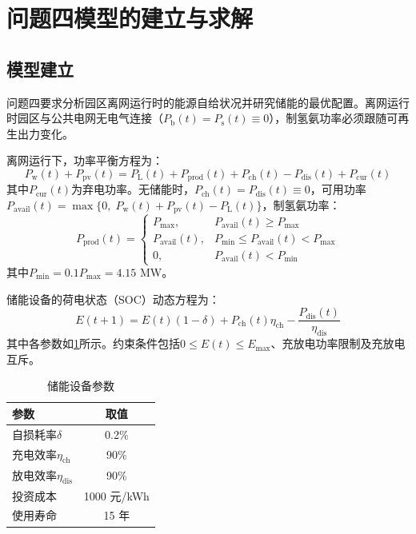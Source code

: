 \section{问题四模型的建立与求解}

\subsection{模型建立}

问题四要求分析园区离网运行时的能源自给状况并研究储能的最优配置。离网运行时园区与公共电网无电气连接（$P_{\mathrm{b}}(t)=P_{\mathrm{s}}(t)\equiv 0$），制氢氨功率必须跟随可再生出力变化。

离网运行下，功率平衡方程为：
\begin{equation}
P_{\mathrm{w}}(t) + P_{\mathrm{pv}}(t) = P_{\mathrm{L}}(t) + P_{\mathrm{prod}}(t) + P_{\mathrm{ch}}(t) - P_{\mathrm{dis}}(t) + P_{\mathrm{cur}}(t) \label{eq:q4_bal}
\end{equation}
其中$P_{\mathrm{cur}}(t)$为弃电功率。无储能时，$P_{\mathrm{ch}}(t)=P_{\mathrm{dis}}(t)\equiv 0$，可用功率$P_{\mathrm{avail}}(t) = \max\{0,\; P_{\mathrm{w}}(t)+P_{\mathrm{pv}}(t)-P_{\mathrm{L}}(t)\}$，制氢氨功率：
\begin{equation}
P_{\mathrm{prod}}(t) = \begin{cases}
P_{\mathrm{max}}, & P_{\mathrm{avail}}(t) \ge P_{\mathrm{max}} \\
P_{\mathrm{avail}}(t), & P_{\mathrm{min}} \le P_{\mathrm{avail}}(t) < P_{\mathrm{max}} \\
0, & P_{\mathrm{avail}}(t) < P_{\mathrm{min}}
\end{cases} \label{eq:q4_prod}
\end{equation}
其中$P_{\mathrm{min}} = 0.1P_{\mathrm{max}} = 4.15$ MW。

储能设备的荷电状态（SOC）动态方程\cite{li2023ieee}为：
\begin{equation}
E(t+1) = E(t)(1-\delta) + P_{\mathrm{ch}}(t)\eta_{\mathrm{ch}} - \frac{P_{\mathrm{dis}}(t)}{\eta_{\mathrm{dis}}} \label{eq:q4_soc}
\end{equation}
其中各参数如\cref{tab:q4_storage_params}所示。约束条件包括$0 \le E(t) \le E_{\mathrm{max}}$、充放电功率限制及充放电互斥。

\begin{table}[H]
\centering
\caption{储能设备参数}
\label{tab:q4_storage_params}
\begin{tabular*}{\textwidth}{@{\extracolsep{\fill}}lc}
\toprule[1.5pt]
参数 & 取值 \\
\midrule[1pt]
自损耗率$\delta$ & 0.2\% \\
充电效率$\eta_{\mathrm{ch}}$ & 90\% \\
放电效率$\eta_{\mathrm{dis}}$ & 90\% \\
投资成本 & 1000 元/kWh \\
使用寿命 & 15 年 \\
\bottomrule[1.5pt]
\end{tabular*}
\end{table}

